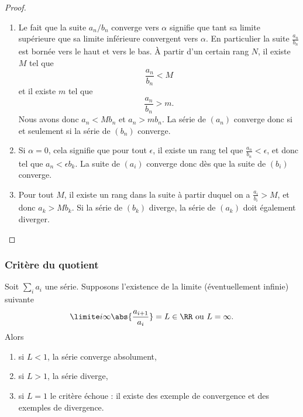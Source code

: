 \begin{proof}
\begin{enumerate}
    \item
        Le fait que la suite $a_n/b_n$ converge vers $\alpha$ signifie que tant sa limite supérieure que sa limite inférieure convergent vers $\alpha$. En particulier la suite $\frac{ a_n }{ b_n }$ est bornée vers le haut et vers le bas. À partir d'un certain rang $N$, il existe $M$ tel que 
        \begin{equation}
            \frac{ a_n }{ b_n }<M
        \end{equation}
        et il existe $m$ tel que
        \begin{equation}
            \frac{ a_n }{ b_n }>m.
        \end{equation}
        Nous avons donc $a_n<Mb_n$ et $a_n>mb_n$. La série de $(a_n)$ converge donc si et seulement si la série de $(b_n)$ converge.
    \item
        Si $\alpha=0$, cela signifie que pour tout $\epsilon$, il existe un rang tel que $\frac{ a_n }{ b_n }<\epsilon$, et donc tel que $a_n<\epsilon b_k$. La suite de $(a_i)$ converge donc dès que la suite de $(b_i)$ converge.
    \item
        Pour tout $M$, il existe un rang dans la suite à partir duquel on a $\frac{ a_i }{ b_i }>M$, et donc $a_k>Mb_k$. Si la série de $(b_k)$ diverge, la série de $(a_k)$ doit également diverger.
\end{enumerate}
\end{proof}

\subsubsection{Critère du quotient}

\begin{proposition}
    Soit $\sum_i a_i$ une série. Supposons l'existence de la limite (éventuellement infinie) suivante
    \begin{equation}
      \limite i \infty \abs{\frac{a_{i+1}}{a_i}} = L\in \RR \text{ ou $L =
        \infty$.}
    \end{equation}
    Alors
    \begin{enumerate}
    \item si $L < 1$, la série converge absolument,
    \item si $L > 1$, la série diverge,
    \item si $L = 1$ le critère échoue : il existe des exemple de convergence et des exemples de divergence.
    \end{enumerate}
\end{proposition}

